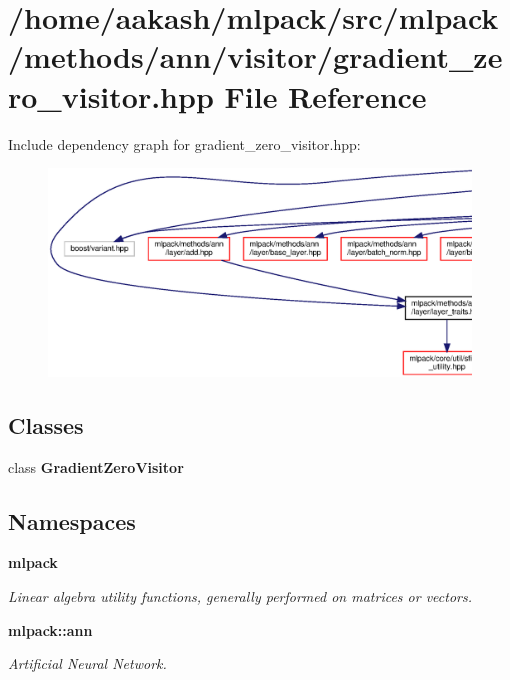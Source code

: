 \section{/home/aakash/mlpack/src/mlpack/methods/ann/visitor/gradient\+\_\+zero\+\_\+visitor.hpp File Reference}
\label{gradient__zero__visitor_8hpp}
Include dependency graph for gradient\+\_\+zero\+\_\+visitor.\+hpp\+:
\nopagebreak
\begin{figure}[H]
\begin{center}
\leavevmode
\includegraphics[width=350pt]{gradient__zero__visitor_8hpp__incl}
\end{center}
\end{figure}
\subsection*{Classes}
\begin{DoxyCompactItemize}
\item 
class \textbf{ Gradient\+Zero\+Visitor}
\end{DoxyCompactItemize}
\subsection*{Namespaces}
\begin{DoxyCompactItemize}
\item 
 \textbf{ mlpack}
\begin{DoxyCompactList}\small\item\em Linear algebra utility functions, generally performed on matrices or vectors. \end{DoxyCompactList}\item 
 \textbf{ mlpack\+::ann}
\begin{DoxyCompactList}\small\item\em Artificial Neural Network. \end{DoxyCompactList}\end{DoxyCompactItemize}


